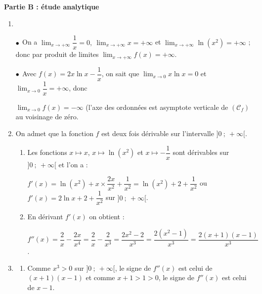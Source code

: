 \bigskip

\textbf{Partie B : étude analytique}

\medskip

\begin{enumerate}
\item ~%

$\bullet~~$On a $\displaystyle\lim_{x \to + \infty} \dfrac 1x = 0, \: \displaystyle\lim_{x \to + \infty} x = + \infty$ et $\displaystyle\lim_{x \to + \infty} \ln \left(x^2\right) = + \infty$ ; donc par produit de limites $\displaystyle\lim_{x \to + \infty} f(x) = + \infty$.

$\bullet~~$Avec $f(x) = 2x \ln x - \dfrac1x$, on sait que $\displaystyle\lim_{x \to 0} x \ln x = 0$ et $\displaystyle\lim_{x \to 0}\dfrac 1x = + \infty$, donc 

$\displaystyle\lim_{x \to 0}f(x) = - \infty$ (l'axe des ordonnées est asymptote verticale de $(\mathcal{C}_f)$ au voisinage de zéro.
\item On admet que la fonction $f$ est deux fois dérivable sur l'intervalle $]0~;~+\infty[$.
	\begin{enumerate}
		\item %
Les fonctions $x \longmapsto x$, \: $x \longmapsto \ln \left(x^2 \right)$ et $x \longmapsto - \dfrac 1x$ sont dérivables sur $]0~;~+ \infty[$ et l'on a :

$f'(x) = \ln \left(x^2 \right) + x \times \dfrac{2x}{x^2} + \dfrac{1}{x^2} = \ln \left(x^2 \right)+  2 +  \dfrac{1}{x^2}$ ou $f'(x) = 2\ln x + 2 + \dfrac{1}{x^2}$ sur $]0~;~+ \infty[$.
		\item %

En dérivant $f'(x)$ on obtient :

$f''(x) = \dfrac2x - \dfrac{2x}{x^4} = \dfrac2x - \dfrac{2}{x^3} = \dfrac{2x^2 - 2}{x^3} = \dfrac{2\left(x^2 - 1\right)}{x^3} = \dfrac{2(x + 1)(x - 1)}{x^3}$.
	\end{enumerate}
\item 
	\begin{enumerate}
		\item %
		Comme $x^3 > 0$ sur $]0~;~+ \infty[$, le signe de $f''(x)$ est celui de $(x + 1)(x - 1)$ et comme $x + 1 > 1 > 0$, le signe de $f''(x)$ est celui de $x - 1$.


\end{enumerate}
\end{enumerate}
